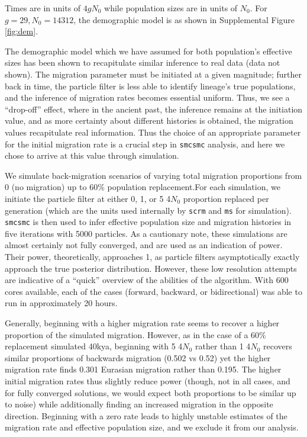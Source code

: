 \documentclass{article}
\begin{document}
Times are in units of $4gN_0$ while population sizes are in units of $N_0$. For $g=29, N_0 = 14312$, the demographic model is as shown in Supplemental Figure \ref{fig:dem}.  

The demographic model which we have assumed for both population's effective sizes has been shown to recapitulate similar inference to real data (data not shown). The migration parameter must be initiated at a given magnitude; further back in time, the particle filter is less able to identify lineage's true populations, and the inference of migration rates becomes essential uniform. Thus, we see a ``drop-off'' effect, where in the ancient past, the inference remains at the initiation value, and as more certainty about different histories is obtained, the migration values recapitulate real information. Thus the choice of an appropriate parameter for the initial migration rate is a crucial step in {\tt smcsmc} analysis, and here we chose to arrive at this value through simulation.

We simulate back-migration scenarios of varying total migration proportions from 0 (no migration) up to 60\% population replacement.For each simulation, we initiate the particle filter at either 0, 1, or 5 4$N_0$ proportion replaced per generation (which are the units used internally by {\tt scrm} and {\tt ms} for simulation).  {\tt smcsmc} is then used to infer effective population size and migration histories in five iterations with 5000 particles. As a cautionary note, these simulations are almost certainly not fully converged, and are used as an indication of power. Their power, theoretically, approaches 1, as particle filters asymptotically exactly approach the true posterior distribution. However, these low resolution attempts are indicative of a ``quick'' overview of the abilities of the algorithm. With 600 cores available, each of the cases (forward, backward, or bidirectional) was able to run in approximately 20 hours. 

Generally, beginning with a higher migration rate seems to recover a higher proportion of the simulated migration. However, as in the case of a 60\% replacement simulated 40kya, beginning with 5 4$N_0$ rather than 1 4$N_0$ recovers similar proportions of backwards migration (0.502 vs 0.52) yet the higher migration rate finds 0.301 Eurasian migration rather than 0.195. The higher initial migration rates thus slightly reduce power (though, not in all cases, and for fully converged solutions, we would expect both proportions to be similar up to noise) while additionally finding an increased migration in the opposite direction.  Beginning with a zero rate leads to highly unstable estimates of the migration rate and effective population size, and we exclude it from our analysis.
\end{document}
